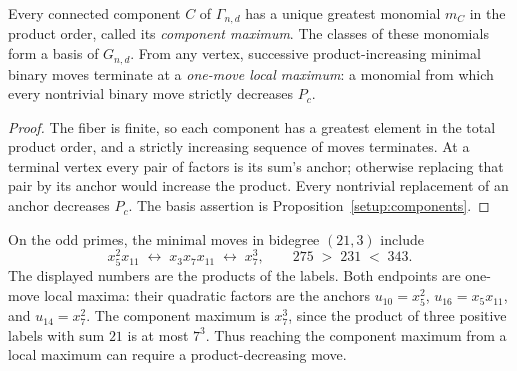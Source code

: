 \begin{proposition}\label{moves:maximal-representatives}
Every connected component $C$ of $\Gamma_{n,d}$ has a unique greatest
monomial $m_C$ in the product order, called its \emph{component maximum}.
The classes of these monomials form a basis of $G_{n,d}$.
From any vertex, successive product-increasing minimal binary moves
terminate at a \emph{one-move local maximum}: a monomial from which
every nontrivial binary move strictly decreases $P_c$.
\end{proposition}
\begin{proof}
The fiber is finite, so each component has a greatest element in the
total product order, and a strictly increasing sequence of moves
terminates. At a terminal vertex every pair of factors is its sum's
anchor; otherwise replacing that pair by its anchor would increase
the product. Every nontrivial replacement of an anchor decreases
$P_c$. The basis assertion is Proposition~\ref{setup:components}.
\end{proof}

\begin{example}\label{moves:local-maxima}
On the odd primes, the minimal moves in bidegree $(21,3)$ include
\[
 x_5^2x_{11}\;\longleftrightarrow\;
 x_3x_7x_{11}\;\longleftrightarrow\;x_7^3,
 \qquad 275\;>\;231\;<\;343.
\]
The displayed numbers are the products of the labels. Both endpoints
are one-move local maxima: their quadratic factors are the anchors
$u_{10}=x_5^2$, $u_{16}=x_5x_{11}$, and $u_{14}=x_7^2$.
The component maximum is $x_7^3$, since the product of three positive
labels with sum $21$ is at most $7^3$. Thus reaching the component
maximum from a local maximum can require a product-decreasing move.
\end{example}

